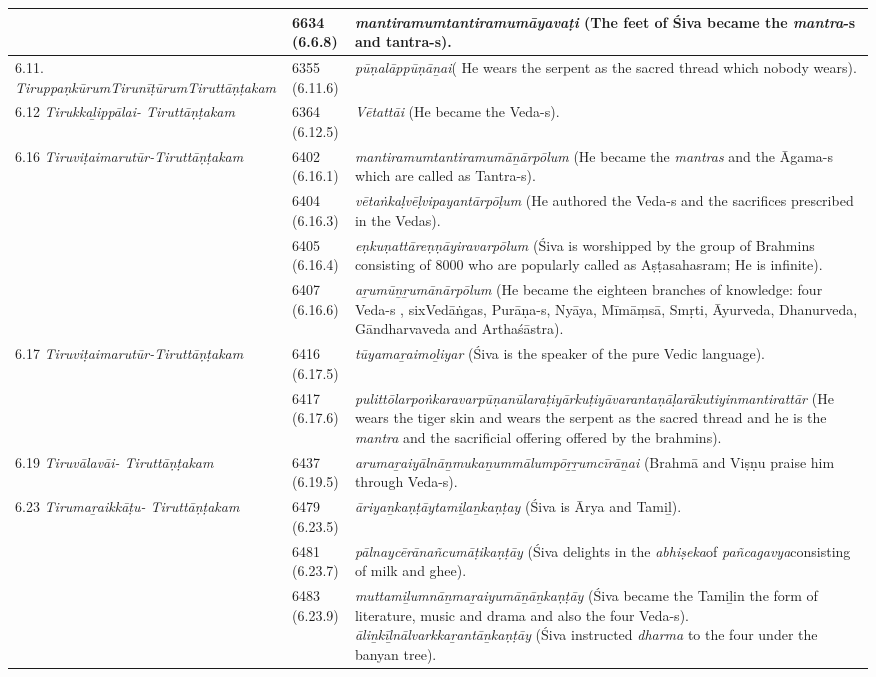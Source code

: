 \begin{longtable}{|m{2.7cm}|m{2.7cm}|>{\raggedright}m{3.1cm}|}
\hline
 & 6634 (6.6.8) & \textit{mantiramumtantira\-mumāyavaṭi} (The feet of Śiva  became the \textit{mantra}-s and tantra-s). \tabularnewline
\hline
6.11. \textit{Tiruppaṇkūrum\-Tirunīṭūrum\-Tiruttāṇṭakam} & 6355 (6.11.6) & \textit{pūṇalāppūṇāṉai}( He wears the serpent as the sacred thread which nobody wears). \tabularnewline
\hline
6.12 \textit{Tirukkaḻippālai- Tiruttāṇṭakam} & 6364 (6.12.5) & \textit{Vētattāi} (He became the Veda-s). \tabularnewline
\hline
6.16 \textit{Tiruviṭaimarutūr-Tiruttāṇṭakam} & 6402 (6.16.1) & \textit{mantiramumtantira\-mumāṉārpōlum}  (He became the \textit{mantras }and the Āgama-s\index{Agama@Āgama} which are called as Tantra-s). \tabularnewline
\hline
 & 6404 (6.16.3) & \textit{vētaṅkaḷvēḷvipayantār\-pōḷum} (He authored the Veda-s and the sacrifices prescribed in the Vedas). \tabularnewline
\hline
 & 6405 (6.16.4) & \textit{eṇkuṇattāreṇṇāyiravar\-pōlum} (Śiva\index{Siva@Śiva} is worshipped by the group of Brahmins consisting of 8000 who are popularly called as Aṣṭasahasram; He is infinite). \tabularnewline
\hline
 & 6407 (6.16.6) & \textit{aṟumūṉṟumānārpōlum} (He became the eighteen branches of knowledge: four Veda-s , sixVedāṅgas, Purāṇa-s, Nyāya, Mīmāṃsā, Smṛti, Āyurveda, Dhanurveda, Gāndharvaveda and Arthaśāstra\index{Arthasastra@Arthaśāstra}). \tabularnewline
\hline
6.17 \textit{Tiruviṭaimarutūr-Tiruttāṇṭakam} & 6416 (6.17.5) & \textit{tūyamaṟaimoḻiyar} (Śiva is the speaker of the pure Vedic language\index{Vedic language}). \tabularnewline
\hline
 & 6417 (6.17.6) & \textit{pulittōlarpoṅkaravar\-pūṇanūlaraṭiyārkuṭi\-yāvarantaṇāḷarākuti\-yinmantirattār} (He wears the tiger skin and wears the serpent as the sacred thread and  he is the \textit{mantra} and the sacrificial offering offered by the brahmins). \tabularnewline
\hline
6.19 \textit{Tiruvālavāi- Tiruttāṇṭakam} & 6437 (6.19.5) & \textit{arumaṟaiyālnāṉmuka\-ṉummālumpōṟṟumcī\-rāṉai} (Brahmā\index{Brahma@Brahmā} and Viṣṇu\index{Visnu@Viṣṇu} praise him through Veda-s). \tabularnewline
\hline
6.23 \textit{Tirumaṟaikkāṭu- Tiruttāṇṭakam} & 6479 (6.23.5) & \textit{āriyaṉkaṇṭāytamiḻaṉ\-kaṇṭay} (Śiva is Ārya and Tamiḻ). \tabularnewline
\hline
 & 6481 (6.23.7) & \textit{pālnaycērānañcumāṭi\-kaṇṭāy} (Śiva delights in the \textit{abhiṣeka}of \textit{pañcagavya}consisting of milk and ghee). \tabularnewline
\hline
 & 6483 (6.23.9) & \textit{muttamiḻumnāṉmaṟai\-yumāṉāṉkaṇṭāy} (Śiva became the Tamiḻin the form of literature, music and drama and also the four Veda-s). \textit{āliṉkīḻnālvarkkaṟantāṉkaṇṭāy} (Śiva instructed \textit{dharma} to the four under the banyan tree). \tabularnewline

\end{longtable}
